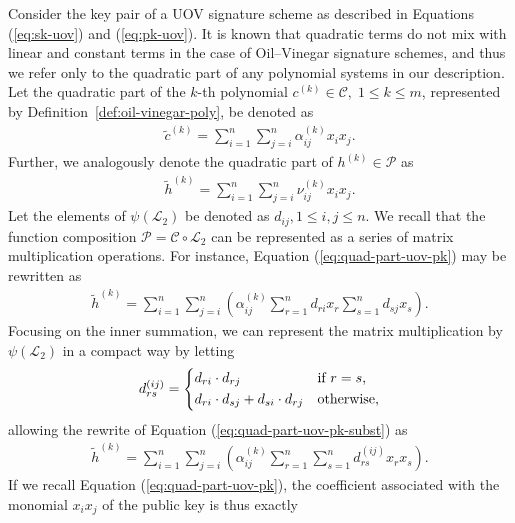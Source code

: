 \documentclass[12pt, a4paper, oneside]{memoir}
\theoremstyle{definition}
\begin{document}
Consider the key pair of a UOV signature scheme as described in Equations (\ref{eq:sk-uov}) and (\ref{eq:pk-uov}). It is known that quadratic terms do not mix with linear and constant terms in the case of Oil--Vinegar signature schemes, and thus we refer only to the quadratic part of any polynomial systems in our description. Let the quadratic part of the $k$-th polynomial $c^{(k)} \in \mathcal{C},\; 1 \leq k \leq m$, represented by Definition~\ref{def:oil-vinegar-poly}, be denoted as
\begin{align}
  \widetilde{c}^{(k)} = \sum_{i = 1}^{n} \sum_{j = i}^{n} \alpha_{ij}^{(k)} x_{i} x_{j}.
\end{align}
Further, we analogously denote the quadratic part of $h^{(k)} \in \mathcal{P}$ as
\begin{align}\label{eq:quad-part-uov-pk}
  \widetilde{h}^{(k)} = \sum_{i = 1}^{n} \sum_{j = i}^{n} \nu_{ij}^{(k)} x_{i} x_{j}.
\end{align}
Let the elements of $\psi(\mathcal{L}_{2})$ be denoted as $d_{ij}, 1 \leq i, j \leq n$. We recall that the function composition $\mathcal{P} = \mathcal{C} \circ \mathcal{L}_{2}$ can be represented as a series of matrix multiplication operations. For instance, Equation (\ref{eq:quad-part-uov-pk}) may be rewritten as
\begin{align}\label{eq:quad-part-uov-pk-subst}
  \widetilde{h}^{(k)} = \sum_{i = 1}^{n} \sum_{j = i}^{n} \left( \alpha_{ij}^{(k)} \sum_{r = 1}^{n} d_{ri} x_{r} \sum_{s = 1}^{n} d_{sj} x_{s} \right).
\end{align}
Focusing on the inner summation, we can represent the matrix multiplication by $\psi(\mathcal{L}_{2})$ in a compact way by letting
\begin{align}
  d_{rs}^{(ij)} =
  \begin{dcases}
    d_{ri} \cdot d_{rj}                         & \text{if } r = s, \\
    d_{ri} \cdot d_{sj} + d_{si} \cdot d_{rj}   & \text{otherwise},
  \end{dcases}
\end{align}
allowing the rewrite of Equation (\ref{eq:quad-part-uov-pk-subst}) as
\begin{align}
  \widetilde{h}^{(k)} = \sum_{i = 1}^{n} \sum_{j = i}^{n} \left( \alpha_{ij}^{(k)} \sum_{r = 1}^{n} \sum_{s = 1}^{n} d_{rs}^{(ij)} x_{r} x_{s} \right).
\end{align}
If we recall Equation (\ref{eq:quad-part-uov-pk}), the coefficient associated with the monomial $x_{i} x_{j}$ of the public key is thus exactly
\end{document}
